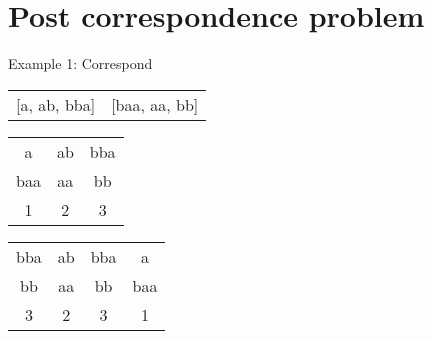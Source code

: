 \documentclass{beamer}
\begin{document}
\section{Post correspondence problem}


\begin{frame}{Example 1: Correspond}
  \begin{table}
    \begin{tabular}{cc}
      [a, ab, bba] & [baa, aa, bb] \\
    \end{tabular}
  \end{table}
  \vspace{3mm}
  \begin{table}
    \begin{tabular}{ccc}
      \toprule
      a   & ab & bba \\
      baa & aa & bb  \\
      {\scriptsize \color{gmitblue} 1} & {\scriptsize \color{gmitblue} 2} & {\scriptsize \color{gmitblue} 3}\\
      \bottomrule
    \end{tabular}
  \end{table}
  \vspace{4mm}
  \begin{table}
    \begin{tabular}{cccc}
      \toprule
      bba & ab & bba & a   \\
      bb  & aa & bb  & baa \\
      {\scriptsize \color{gmitblue} 3} & {\scriptsize \color{gmitblue} 2} & {\scriptsize \color{gmitblue} 3} & {\scriptsize \color{gmitblue} 1}\\
      \bottomrule
    \end{tabular}
  \end{table}
\end{frame}
\end{document}
